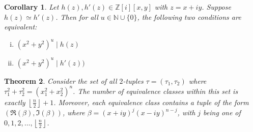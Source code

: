 \documentclass[12pt]{article}
\newtheorem{theorem}{Theorem}[section]
\newtheorem{corollary}[theorem]{Corollary}
\theoremstyle{definition}
\theoremstyle{remark}
\newcommand{\Nnn}{\mathbb N}
\newcommand{\Zzz}{\mathbb Z}
\newcommand{\vanish}[1]{}
\newcommand{\divides}{\mid}
\numberwithin{equation}{section}
\begin{document}
\vanish{
\begin{corollary}
Let \( h(z), h'(z) \in \Zzz[i][x,y] \) with \( z = x+ iy \).
\[
h(z) \simeq h'(z) 
\implies 
( \forall u \in \Nnn \cup \{ 0 \},  ( x^2 + y^2 ) ^ u \divides h(z)  \iff ( x^2 + y^2 ) ^ u \divides h'(z)  )
\]
\end{corollary}
}

\begin{corollary}
\label{corollary_equivalence}
Let \( h(z), h'(z) \in \Zzz[i][x,y] \) with \( z = x+ iy \).
Suppose \( h(z) \simeq h'(z) \). Then for all  \( u \in \Nnn \cup \{ 0 \} \),
the following two conditions are
equivalent:
\begin{enumerate}[i.]
\item \( ( x^2 + y^2 ) ^ u \divides h(z) \)
\item \( ( x^2 + y^2 ) ^ u \divides h'(z)  ) \)
\end{enumerate}
\end{corollary}




\begin{theorem}
Consider the set of all \(2\)-tuples \( \tau = ( \tau_1, \tau_2 )\) where 
\(
  \tau_1 ^ 2   +   \tau_2 ^ 2   
= 
\left(  x_1 ^ 2 + x_2 ^ 2  \right) ^ n 
\).
The number of equivalence classes within this set 
is exactly  \( \left\lfloor \frac{n}{2} \right\rfloor + 1 \). 
Moreover, each equivalence class contains a tuple
of the form \( ( \Re( \beta ) , \Im( \beta ) ) \),
where \( \beta = (x + iy)^j (x -  iy)^{n-j} \),
with \( j \)
being one of \( 0, 1, 2, \ldots, \left\lfloor \frac{n}{2} \right\rfloor \).
\end{theorem}
\end{document}
